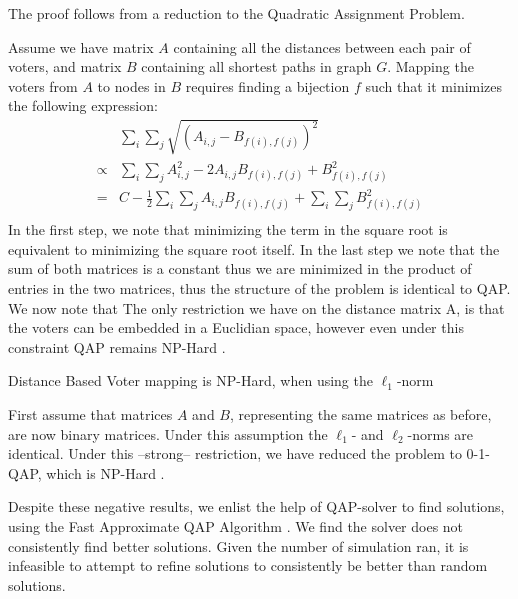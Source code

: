 \begin{proofc}{}
	The proof follows from a reduction to the Quadratic Assignment Problem. 

	Assume we have matrix $A$ containing all the distances between each pair of voters, and matrix $B$ containing all shortest paths in graph $G$. Mapping the voters from $A$ to nodes in $B$ requires finding a bijection $f$ such that it minimizes the following expression: 
$$
	\begin{aligned}
	&\sum_{i} \sum_{j} \sqrt{\left(A_{i,j} -B_{f(i),f(j)}\right)^2}\\
	\propto&\sum_{i} \sum_{j} A_{i,j}^2 -2A_{i,j}B_{f(i),f(j)} + B_{f(i),f(j)}^2\\
	=& C - \frac{1}{2} \sum_{i} \sum_{j} A_{i,j}B_{f(i),f(j)} + \sum_{i} \sum_{j}  B_{f(i),f(j)}^2\\
	\end{aligned}
$$
	In the first step, we note that minimizing the term in the square root is
	equivalent to minimizing the square root itself. In the last step we note that
	the sum of both matrices is a constant thus we are minimized in the product of entries
	in the two matrices, thus the structure of the problem is identical to QAP. We
	now note that The only restriction we have on the distance matrix A, is that
	the voters can be embedded in a Euclidian space, however even under this
	constraint QAP remains NP-Hard \cite{queyrannePerformanceRatioPolynomial1986}.
\end{proofc}

\begin{corollary}{}
	Distance Based Voter mapping is NP-Hard, when using the $\ell_1$-norm
\end{corollary}

\begin{proofc}{}
	First assume that matrices $A$ and $B$, representing the same matrices as before, are now binary matrices. Under this assumption the $\ell_1$- and $\ell_2$-norms are identical. Under this --strong-- restriction, we have reduced the problem to 0-1-QAP, which is NP-Hard \cite{nagarajanMaximumQuadraticAssignment}.
\end{proofc}

Despite these negative results, we enlist the help of QAP-solver
\cite{virtanenSciPy10Fundamental2020}  to find solutions, using the Fast
Approximate QAP Algorithm \cite{vogelsteinFastApproximateQuadratic2015}. We
find the solver does not consistently find better solutions. Given the number
of simulation ran, it is infeasible to attempt to refine solutions to
consistently be better than random solutions.


